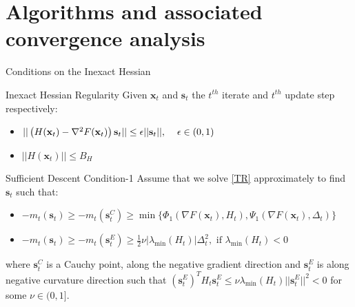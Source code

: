 \documentclass{beamer}
\newcommand{\h}{\nabla^{2}}
\newcommand{\g}{\nabla}
\newcommand{\xbold}{\mathbf{x}}
\newcommand{\sbold}{\mathbf{s}}
\newcommand{\mineig}{\lambda_{\min}}
\begin{document}
\section{Algorithms and associated convergence analysis}
\begin{frame}{Conditions on the Inexact Hessian}
\begin{alertblock}{Inexact Hessian Regularity}
Given \(\xbold_{t}\) and \(\sbold_{t}\) the \(t^{th}\) iterate and \(t^{th}\) update step respectively:
\begin{itemize}
\item \(||\left(H(\xbold_{t}) - \h F(\xbold_{t})\right)\sbold_{t}|| \leq \epsilon||\sbold_{t}||, \hspace{4mm} \epsilon \in (0,1)\)
\item \(||H(\xbold_{t}) || \leq B_{H}\)
\end{itemize}
\end{alertblock}
\pause
\begin{alertblock}{Sufficient Descent Condition-1}
Assume that we solve \ref{TR} approximately to find \(\sbold_{t}\) such that:
\begin{itemize}
\item \(-m_{t}(\sbold_{t}) \geq -m_{t}(\sbold_{t}^{C}) \geq \min\lbrace\Phi_{1}(\g F(\xbold_{t}), H_{t}), \Psi_{1}(\g F(\xbold_{t}), \Delta_{t})\rbrace \)
\item \(-m_{t}(\sbold_{t}) \geq -m_{t}(\sbold_{t}^{E}) \geq \frac{1}{2}\nu|\mineig(H_{t})|\Delta_{t}^{2}, \text{ if } \mineig(H_{t}) < 0 \)
\end{itemize}
where \(\sbold_{t}^{C}\) is a Cauchy point, along the negative gradient direction and \(\sbold_{t}^{E}\) is along negative curvature direction such that \((\sbold_{t}^{E})^{T} H_{t} \sbold_{t}^{E} \leq \nu\mineig(H_{t})||\sbold_{t}^{E}||^{2} < 0\) for some \(\nu \in (0, 1]\).
\end{alertblock}
\end{frame}
\end{document}
